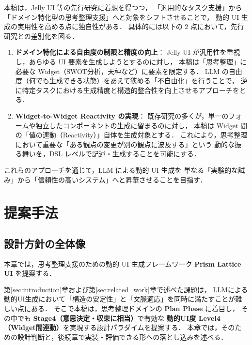 \documentclass[a4paper,10pt]{jarticle}
\begin{document}
本稿は，Jelly UI 等の先行研究\cite{cao2025jelly}に着想を得つつ，
「汎用的なタスク支援」から「ドメイン特化型の思考整理支援」へと対象をシフトさせることで，
動的 UI 生成の実用性を高める点に独自性がある．
具体的には以下の 2 点において，先行研究との差別化を図る．

\begin{enumerate}
  \item \textbf{ドメイン特化による自由度の制限と精度の向上}：
        Jelly UI が汎用性を重視し，あらゆる UI 要素を生成しようとするのに対し，
        本稿は「思考整理」に必要な Widget（SWOT分析，天秤など）に要素を限定する．
        LLM の自由度（何でも生成できる状態）をあえて狭める「不自由化」を行うことで，
        逆に特定タスクにおける生成精度と構造的整合性を向上させるアプローチをとる．
        
  \item \textbf{Widget-to-Widget Reactivity の実現}：
        既存研究の多くが，単一のフォームや独立したコンポーネントの生成に留まるのに対し，
        本稿は Widget 間の「値の連動（Reactivity）」自体を生成対象とする．
        これにより，思考整理において重要な「ある観点の変更が別の観点に波及する」という
        動的な振る舞いを，DSL レベルで記述・生成することを可能にする．
\end{enumerate}

これらのアプローチを通じて，LLM による動的 UI 生成を
単なる「実験的な試み」から「信頼性の高いシステム」へと昇華させることを目指す．



\section{提案手法}
\label{sec:system_design}

\subsection{設計方針の全体像}

本章では，思考整理支援のための動的 UI 生成フレームワーク \textbf{Prism Lattice UI} を提案する．

第\ref{sec:introduction}章および第\ref{sec:related_work}章で述べた課題は，
LLMによる動的UI生成において「構造の安定性」と「文脈適応」を同時に満たすことが難しい点にある．
そこで本稿は，思考整理ドメインの \textbf{Plan Phase} に着目し，
その中でも \textbf{Stage4（意思決定・収束に相当）}で有効な
\textbf{動的UI度 Level4（Widget間連動）}を実現する設計パラダイムを提案する．
本章では，そのための設計判断と，後続章で実装・評価できる形への落とし込みを述べる．
\end{document}
